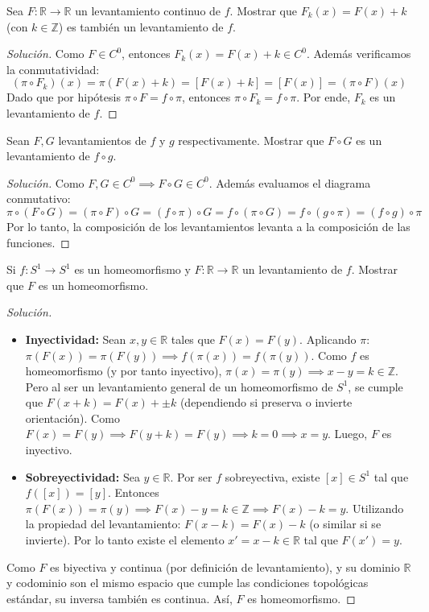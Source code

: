 \begin{ejercicio}
	Sea $F: \mathbb{R} \to \mathbb{R}$ un levantamiento continuo de $f$. Mostrar que $F_k(x) = F(x) + k$ (con $k \in \mathbb{Z}$) es también un levantamiento de $f$.
\end{ejercicio}
\begin{proof}[Solución]
	Como $F \in C^0$, entonces $F_k(x) = F(x)+k \in C^0$. Además verificamos la conmutatividad:
	$$ (\pi \circ F_k)(x) = \pi(F(x)+k) = [F(x)+k] = [F(x)] = (\pi \circ F)(x) $$
	Dado que por hipótesis $\pi \circ F = f \circ \pi$, entonces $\pi \circ F_k = f \circ \pi$. Por ende, $F_k$ es un levantamiento de $f$.
\end{proof}

\begin{ejercicio}
	Sean $F, G$ levantamientos de $f$ y $g$ respectivamente. Mostrar que $F \circ G$ es un levantamiento de $f \circ g$.
\end{ejercicio}
\begin{proof}[Solución]
	Como $F, G \in C^0 \implies F \circ G \in C^0$. 
	Además evaluamos el diagrama conmutativo:
	$$ \pi \circ (F \circ G) = (\pi \circ F) \circ G = (f \circ \pi) \circ G = f \circ (\pi \circ G) = f \circ (g \circ \pi) = (f \circ g) \circ \pi $$
	Por lo tanto, la composición de los levantamientos levanta a la composición de las funciones.
\end{proof}

\begin{ejercicio}
	Si $f: S^1 \to S^1$ es un homeomorfismo y $F: \mathbb{R} \to \mathbb{R}$ un levantamiento de $f$. Mostrar que $F$ es un homeomorfismo.
\end{ejercicio}
\begin{proof}[Solución]
	\begin{itemize}
		\item \textbf{Inyectividad:} Sean $x, y \in \mathbb{R}$ tales que $F(x) = F(y)$. 
		Aplicando $\pi$: $\pi(F(x)) = \pi(F(y)) \implies f(\pi(x)) = f(\pi(y))$. Como $f$ es homeomorfismo (y por tanto inyectivo), $\pi(x) = \pi(y) \implies x - y = k \in \mathbb{Z}$.
		Pero al ser un levantamiento general de un homeomorfismo de $S^1$, se cumple que $F(x+k) = F(x) + \pm k$ (dependiendo si preserva o invierte orientación). Como $F(x) = F(y) \implies F(y+k) = F(y) \implies k = 0 \implies x = y$. Luego, $F$ es inyectivo.
		\item \textbf{Sobreyectividad:} Sea $y \in \mathbb{R}$. Por ser $f$ sobreyectiva, existe $[x] \in S^1$ tal que $f([x]) = [y]$.
		Entonces $\pi(F(x)) = \pi(y) \implies F(x) - y = k \in \mathbb{Z} \implies F(x) - k = y$.
		Utilizando la propiedad del levantamiento: $F(x-k) = F(x) - k$ (o similar si se invierte). Por lo tanto existe el elemento $x' = x-k \in \mathbb{R}$ tal que $F(x') = y$.
	\end{itemize}
	Como $F$ es biyectiva y continua (por definición de levantamiento), y su dominio $\mathbb{R}$ y codominio son el mismo espacio que cumple las condiciones topológicas estándar, su inversa también es continua. Así, $F$ es homeomorfismo.
\end{proof}

